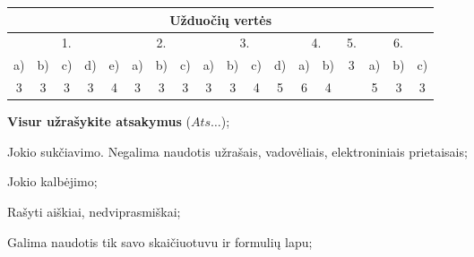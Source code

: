 \documentclass[a4paper]{article}
\begin{document}
\begin{table}[!htpb]
      \centering
      \begin{tabular}{|cccccccccccccccccc|}
            \hline
            \multicolumn{18}{|c|}{Užduočių vertės}

            \\
            \hline
            \multicolumn{5}{|c|}{1.}
                                                    &
            \multicolumn{3}{c|}{2.}                 &
            \multicolumn{4}{c|}{3.}
                                                    & \multicolumn{2}{c|}{4.} &
            \multicolumn{1}{c|}{5.}                 & \multicolumn{3}{c|}{6.}
            \\ \hline
            \multicolumn{1}{|c|}{a)}                & \multicolumn{1}{c|}{b)} &
            \multicolumn{1}{c|}{c)}                 & \multicolumn{1}{c|}{d)} &
            \multicolumn{1}{c|}{e)}                 &
            \multicolumn{1}{c|}{a)}                 & \multicolumn{1}{c|}{b)} &
            \multicolumn{1}{c|}{c)}                 &
            \multicolumn{1}{c|}{a)}                 & \multicolumn{1}{c|}{b)} &
            \multicolumn{1}{c|}{c)}                 &
            \multicolumn{1}{c|}{d)}                 & \multicolumn{1}{c|}{a)} &
            \multicolumn{1}{c|}{b)}                 &
            \multicolumn{1}{c|}{\multirow{2}{*}{3}} & \multicolumn{1}{c|}{a)} &
            \multicolumn{1}{c|}{b)}                 & c)
            \\
            \multicolumn{1}{|c|}{3}                 & \multicolumn{1}{c|}{3}  &
            \multicolumn{1}{c|}{3}                  & \multicolumn{1}{c|}{3}  &
            \multicolumn{1}{c|}{4}                  &
            \multicolumn{1}{c|}{3}                  & \multicolumn{1}{c|}{3}  &
            \multicolumn{1}{c|}{3}                  &
            \multicolumn{1}{c|}{3}                  & \multicolumn{1}{c|}{3}  &
            \multicolumn{1}{c|}{4}                  &
            \multicolumn{1}{c|}{5}                  & \multicolumn{1}{c|}{6}  &
            \multicolumn{1}{c|}{4}                  &
            \multicolumn{1}{c|}{}                   & \multicolumn{1}{c|}{5}  &
            \multicolumn{1}{c|}{3}                  & 3
            \\ \hline
      \end{tabular}
\end{table}

\begin{small}
      \begin{enumerate*}[label={(\arabic*)}]
            \item \textbf{Visur užrašykite atsakymus} ($Ats\ldots$);
            \item Jokio sukčiavimo. Negalima naudotis užrašais, vadovėliais,
            elektroniniais prietaisais;
            \item Jokio kalbėjimo;
            \item Rašyti aiškiai, nedviprasmiškai;
            \item Galima naudotis tik savo skaičiuotuvu ir formulių lapu;
      \end{enumerate*}
\end{small}
\bigskip
\end{document}
